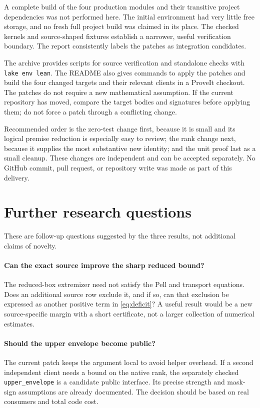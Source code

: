 \documentclass[11pt]{article}
\newcommand{\code}[1]{\nolinkurl{#1}}
\begin{document}
A complete build of the four production modules and their transitive project
dependencies was not performed here. The initial environment had very little
free storage, and no fresh full project build was claimed in its place.
The checked kernels and source-shaped fixtures establish a narrower, useful
verification boundary. The report consistently labels the patches as
integration candidates.

The archive provides scripts for source verification and standalone checks
with \texttt{lake env lean}. The README also gives commands to apply the
patches and build the four changed targets and their relevant clients in a
ProveIt checkout. The patches do not
require a new mathematical assumption. If the current repository has moved,
compare the target bodies and signatures before applying them; do not force a
patch through a conflicting change.

Recommended order is the zero-test change first, because it is small and its
logical premise reduction is especially easy to review; the rank change next,
because it supplies the most substantive new identity; and the unit proof last
as a small cleanup. These changes are independent and can be accepted
separately. No GitHub commit, pull request, or repository write was made as
part of this delivery.

\section{Further research questions}

These are follow-up questions suggested by the three results, not additional
claims of novelty.

\paragraph{Can the exact source improve the sharp reduced bound?}
The reduced-box extremizer need not satisfy the Pell and transport equations.
Does an additional source row exclude it, and if so, can that exclusion be
expressed as another positive term in \eqref{eq:deficit}? A useful result would
be a new source-specific margin with a short certificate, not a larger
collection of numerical estimates.

\paragraph{Should the upper envelope become public?}
The current patch keeps the argument local to avoid helper overhead. If a
second independent client needs a bound on the native rank, the separately
checked \code{upper_envelope} is a candidate public interface. Its precise
strength and mask-sign assumptions are already documented. The decision
should be based on real consumers and total code cost.
\end{document}
